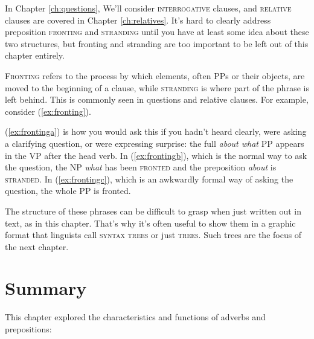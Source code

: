 In Chapter \ref{ch:questions}, We'll consider \textsc{interrogative} clauses, and \textsc{relative} clauses are covered in Chapter \ref{ch:relatives}. It's hard to clearly address preposition \textsc{fronting} and \textsc{stranding} until you have at least some idea about these two structures, but fronting and stranding are too important to be left out of this chapter entirely.

\textsc{Fronting} refers to the process by which elements, often PPs or their objects, are moved to the beginning of a clause, while \textsc{stranding} is where part of the phrase is left behind. This is commonly seen in questions and relative clauses. For example, consider (\ref{ex:fronting}).

\ea \label{ex:fronting}
    \label{ex:frontinga}
    \label{ex:frontingb}
    \label{ex:frontingc}
    \z
\z

(\ref{ex:frontinga}) is how you would ask this if you hadn't heard clearly, were asking a clarifying question, or were expressing surprise: the full \textit{about what} PP appears in the VP after the head verb. In (\ref{ex:frontingb}), which is the normal way to ask the question, the NP \textit{what} has been \textsc{fronted} and the preposition \textit{about} is \textsc{stranded}. In (\ref{ex:frontingc}), which is an awkwardly formal way of asking the question, the whole PP is fronted.

The structure of these phrases can be difficult to grasp when just written out in text, as in this chapter. That's why it's often useful to show them in a graphic format that linguists call \textsc{syntax trees} or just \textsc{trees}. Such trees are the focus of the next chapter.

\section{Summary}

This chapter explored the characteristics and functions of adverbs and prepositions:

